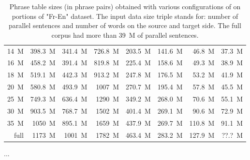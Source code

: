 \begin{table}[ht]
\begin{tabular}{ | r | r | r | r | r | r | r | r | }
14~M & 398.3~M & 341.4~M & 726.8~M & 203.5~M & 141.6~M & 46.8~M & 37.3~M \\
16~M & 458.2~M & 391.4~M & 819.8~M & 225.4~M & 158.6~M & 49.3~M & 38.9~M \\
18~M & 519.1~M & 442.3~M & 913.2~M & 247.8~M & 176.5~M & 53.2~M & 41.9~M \\
20~M & 580.8~M & 493.9~M & 1007~M & 270.7~M & 195.4~M & 57.8~M & 45.5~M \\
\hline
25~M & 749.3~M & 636.4~M & 1290~M & 349.2~M & 268.0~M & 70.6~M & 55.1~M \\
30~M & 903.5~M & 768.7~M & 1502~M & 401.4~M & 269.1~M & 90.6~M & 72.9~M \\
\hline
35~M & 1050~M & 895.1~M & 1659~M & 437.9~M & 269.7~M & 110.8~M & 91.1~M \\
full & 1173~M & 1001~M & 1782~M & 463.4~M & 283.2~M & 127.9~M & ??.?~M \\ %
\hline
\end{tabular}
\caption{\label{fr-en-output-size-benchmarking}
Phrase table sizes (in phrase pairs) obtained with various configurations of \eppex{}
on portions of "Fr-En" dataset. The input data size triple stands for: number of
parallel sentences and number of words on the source and target side.
The full corpus had more than 39~M of parallel sentences.}
\end{table}

...
